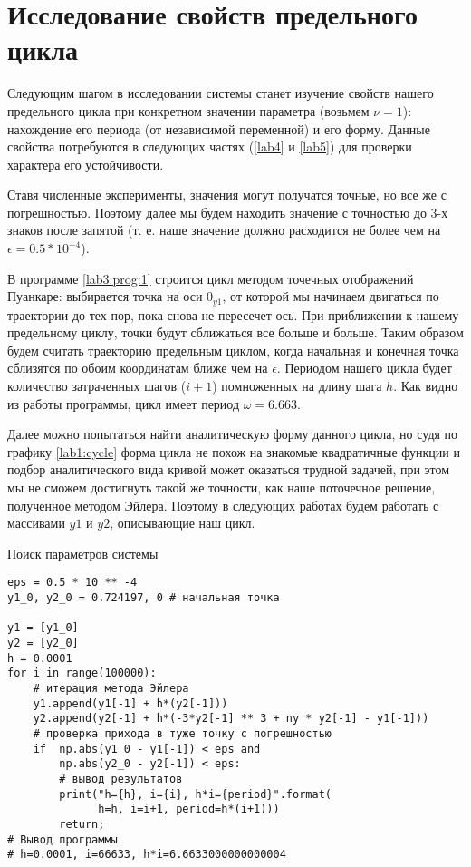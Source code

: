 \chapter{Исследование свойств предельного цикла}

Следующим шагом в исследовании системы станет изучение свойств нашего
предельного цикла при конкретном значении параметра (возьмем $\nu = 1$):
нахождение его периода (от независимой переменной) и его форму. Данные свойства
потребуются в следующих частях (\ref{lab4} и \ref{lab5}) для проверки
характера его устойчивости.

Ставя численные эксперименты, значения могут получатся точные, но все же с
погрешностью. Поэтому далее мы будем находить значение с точностью до 3-х знаков
после запятой (т. е. наше значение должно расходится не более чем на
$\epsilon = 0.5 * 10 ^{-4}$).

В программе \ref{lab3:prog:1} строится цикл методом точечных отображений Пуанкаре:
выбирается точка на оси $0_{y1}$, от которой мы начинаем двигаться по траектории
до тех пор, пока снова не пересечет ось. При приближении к нашему предельному
циклу, точки будут сближаться все больше и больше. Таким образом будем считать
траекторию предельным циклом, когда начальная и конечная точка сблизятся по
обоим координатам ближе чем на $\epsilon$. Периодом нашего цикла будет
количество затраченных шагов ($i + 1$) помноженных на длину шага $h$.
Как видно из работы программы, цикл имеет период $\omega = 6.663$.

Далее можно попытаться найти аналитическую форму данного цикла, но судя по
графику \ref{lab1:cycle} форма цикла не похож на знакомые квадратичные функции и
подбор аналитического вида кривой может оказаться трудной задачей, при этом мы
не сможем достигнуть такой же точности, как наше поточечное решение, полученное
методом Эйлера. Поэтому в следующих работах будем работать с массивами $y1$ и
$y2$, описывающие наш цикл.

\begin{program}
    \caption{Поиск параметров системы}
    \label{lab3:prog:1}
    \begin{verbatim}
eps = 0.5 * 10 ** -4
y1_0, y2_0 = 0.724197, 0 # начальная точка

y1 = [y1_0]
y2 = [y2_0]
h = 0.0001
for i in range(100000):
    # итерация метода Эйлера
    y1.append(y1[-1] + h*(y2[-1]))
    y2.append(y2[-1] + h*(-3*y2[-1] ** 3 + ny * y2[-1] - y1[-1]))
    # проверка прихода в туже точку с погрешностью
    if  np.abs(y1_0 - y1[-1]) < eps and
        np.abs(y2_0 - y2[-1]) < eps:
        # вывод результатов
        print("h={h}, i={i}, h*i={period}".format(
              h=h, i=i+1, period=h*(i+1)))
        return;
# Вывод программы
# h=0.0001, i=66633, h*i=6.6633000000000004
    \end{verbatim}
\end{program}


